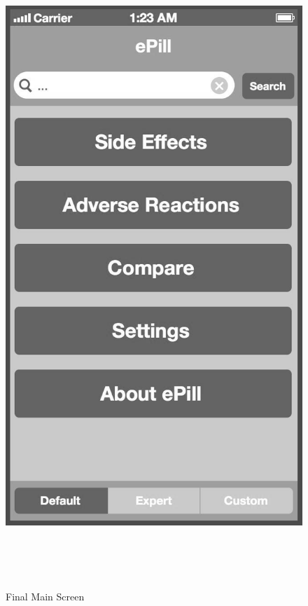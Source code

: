 \begin{figure}[!ptbh]
\begin{minipage}[b]{0.45\linewidth}
        \includegraphics[width=0.8025\linewidth]{figures/Screen_1_bw.jpg}
        \caption[Final Main Screen]{Final Main Screen}
        \label{fig:FinalMainScreen}
    \end{minipage}
    \\
    \\
    \\
    \begin{minipage}[b]{0.45\linewidth}
        \centering

\end{minipage}
\end{figure}
